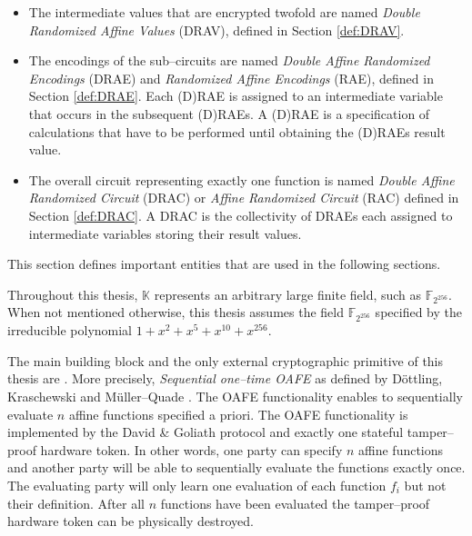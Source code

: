 \begin{itemize}

  \item The intermediate values that are encrypted twofold are named
    \emph{Double Randomized Affine Values} (DRAV), defined in Section
    \ref{def:DRAV}.

  \item The encodings of the sub--circuits are named \emph{Double Affine
    Randomized Encodings} (DRAE) and \emph{Randomized Affine Encodings} (RAE),
    defined in Section \ref{def:DRAE}. Each (D)RAE is assigned to an
    intermediate variable that occurs in the subsequent (D)RAEs. A (D)RAE is a
    specification of calculations that have to be performed until obtaining the
    (D)RAEs result value.

  \item The overall circuit representing exactly one function is named
    \emph{Double Affine Randomized Circuit} (DRAC) or \emph{Affine Randomized
    Circuit} (RAC) defined in Section \ref{def:DRAC}. A DRAC is the collectivity
    of DRAEs each assigned to intermediate variables storing their result
    values.


\end{itemize}


%
%
\label{sec:rae-definitions}

This section defines important entities that are used in the following sections.

\label{sec:field}

\label{def:field} Throughout this thesis, $\mathbb{K}$ represents an arbitrary
large finite field, such as $\mathbb{F}_{2^{256}}$.  When not mentioned
otherwise, this thesis assumes the field $\mathbb{F}_{2^{256}}$ specified by the
irreducible polynomial $1 + x^2 + x^5 + x^{10} + x^{256}$.



The main building block and the only external cryptographic primitive of this
thesis are . More
precisely, \emph{Sequential one--time OAFE} as defined by Döttling, Kraschewski
and Müller--Quade \cite{davidgoliath}. The OAFE functionality enables to
sequentially evaluate $n$ affine functions specified a priori. The OAFE
functionality is implemented by the David \& Goliath protocol
\cite{davidgoliath} and exactly one stateful tamper--proof hardware token. In
other words, one party can specify $n$ affine functions and another party will
be able to sequentially evaluate the functions exactly once. The evaluating
party will only learn one evaluation of each function $f_i$ but not their
definition. After all $n$ functions have been evaluated the tamper--proof
hardware token can be physically destroyed.

